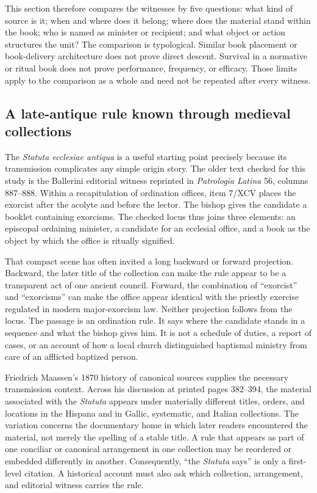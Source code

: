 This section therefore compares the witnesses by five questions: what kind of
source is it; when and where does it belong; where does the material stand
within the book; who is named as minister or recipient; and what object or
action structures the unit? The comparison is typological. Similar book
placement or book-delivery architecture does not prove direct descent.
Survival in a normative or ritual book does not prove performance, frequency,
or efficacy. Those limits apply to the comparison as a whole and need not be
repeated after every witness.

\subsection{A late-antique rule known through medieval collections}

The \emph{Statuta ecclesiae antiqua} is a useful starting point precisely
because its transmission complicates any simple origin story. The older text
checked for this study is the Ballerini editorial witness reprinted in
\emph{Patrologia Latina} 56, columns 887--888. Within a recapitulation of
ordination offices, item 7/XCV places the exorcist after the acolyte and before
the lector. The bishop gives the candidate a booklet containing exorcisms.
The checked locus thus joins three elements: an episcopal ordaining minister,
a candidate for an ecclesial office, and a book as the object by which the
office is ritually signified.

That compact scene has often invited a long backward or forward projection.
Backward, the later title of the collection can make the rule appear to be a
transparent act of one ancient council. Forward, the combination of
``exorcist'' and ``exorcisms'' can make the office appear identical with the
priestly exercise regulated in modern major-exorcism law. Neither projection
follows from the locus. The passage is an ordination rule. It says where the
candidate stands in a sequence and what the bishop gives him. It is not a
schedule of duties, a report of cases, or an account of how a local church
distinguished baptismal ministry from care of an afflicted baptized person.

Friedrich Maassen's 1870 history of canonical sources supplies the necessary
transmission context. Across his discussion at printed pages 382--394, the
material associated with the \emph{Statuta} appears under materially different
titles, orders, and locations in the Hispana and in Gallic, systematic, and
Italian collections. The variation concerns the documentary home in which
later readers encountered the material, not merely the spelling of a stable
title. A rule that appears as part of one conciliar or canonical arrangement
in one collection may be reordered or embedded differently in another.
Consequently, ``the \emph{Statuta} says'' is only a first-level citation. A
historical account must also ask which collection, arrangement, and editorial
witness carries the rule.

